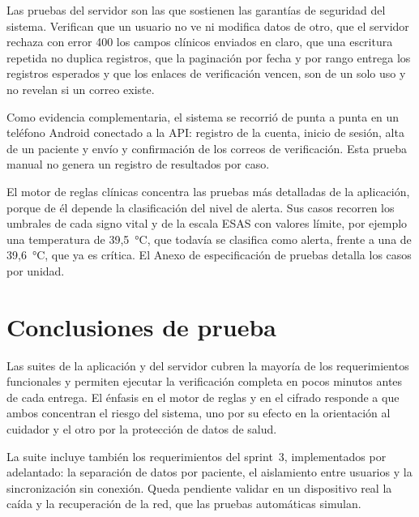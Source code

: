 Las pruebas del servidor son las que sostienen las garantías de seguridad del
sistema. Verifican que un usuario no ve ni modifica datos de otro, que el
servidor rechaza con error 400 los campos clínicos enviados en claro, que una
escritura repetida no duplica registros, que la paginación por fecha y por rango
entrega los registros esperados y que los enlaces de verificación vencen, son de
un solo uso y no revelan si un correo existe.

Como evidencia complementaria, el sistema se recorrió de punta a punta en un
teléfono Android conectado a la API: registro de la cuenta, inicio de sesión,
alta de un paciente y envío y confirmación de los correos de verificación. Esta
prueba manual no genera un registro de resultados por caso.

El motor de reglas clínicas concentra las pruebas más detalladas de la aplicación, porque de él
depende la clasificación del nivel de alerta. Sus casos recorren los
umbrales de cada signo vital y de la escala ESAS con valores límite, por ejemplo
una temperatura de 39,5~°C, que todavía se clasifica como alerta, frente a una
de 39,6~°C, que ya es crítica. El Anexo de especificación de pruebas detalla los
casos por unidad.

\section[Conclusiones]{Conclusiones de prueba}

Las suites de la aplicación y del servidor cubren la mayoría de los
requerimientos funcionales y permiten ejecutar la verificación completa en pocos minutos
antes de cada entrega. El énfasis en el motor de reglas y en el cifrado responde
a que ambos concentran el riesgo del sistema, uno por su efecto en la
orientación al cuidador y el otro por la protección de datos de salud.

La suite incluye también los requerimientos del sprint~3, implementados por
adelantado: la separación de datos por paciente, el aislamiento entre usuarios y
la sincronización sin conexión. Queda pendiente validar en un dispositivo real
la caída y la recuperación de la red, que las pruebas automáticas simulan.

